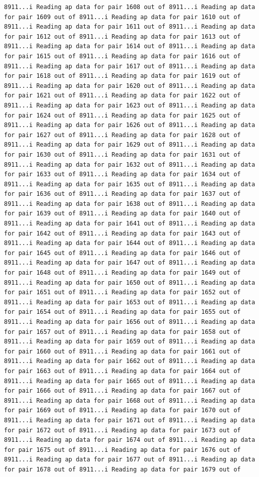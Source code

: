 \documentclass[
]{article}
\begin{document}
\begin{verbatim}
8911...i Reading ap data for pair 1608 out of 8911...i Reading ap data for pair 1609 out of 8911...i Reading ap data for pair 1610 out of 8911...i Reading ap data for pair 1611 out of 8911...i Reading ap data for pair 1612 out of 8911...i Reading ap data for pair 1613 out of 8911...i Reading ap data for pair 1614 out of 8911...i Reading ap data for pair 1615 out of 8911...i Reading ap data for pair 1616 out of 8911...i Reading ap data for pair 1617 out of 8911...i Reading ap data for pair 1618 out of 8911...i Reading ap data for pair 1619 out of 8911...i Reading ap data for pair 1620 out of 8911...i Reading ap data for pair 1621 out of 8911...i Reading ap data for pair 1622 out of 8911...i Reading ap data for pair 1623 out of 8911...i Reading ap data for pair 1624 out of 8911...i Reading ap data for pair 1625 out of 8911...i Reading ap data for pair 1626 out of 8911...i Reading ap data for pair 1627 out of 8911...i Reading ap data for pair 1628 out of 8911...i Reading ap data for pair 1629 out of 8911...i Reading ap data for pair 1630 out of 8911...i Reading ap data for pair 1631 out of 8911...i Reading ap data for pair 1632 out of 8911...i Reading ap data for pair 1633 out of 8911...i Reading ap data for pair 1634 out of 8911...i Reading ap data for pair 1635 out of 8911...i Reading ap data for pair 1636 out of 8911...i Reading ap data for pair 1637 out of 8911...i Reading ap data for pair 1638 out of 8911...i Reading ap data for pair 1639 out of 8911...i Reading ap data for pair 1640 out of 8911...i Reading ap data for pair 1641 out of 8911...i Reading ap data for pair 1642 out of 8911...i Reading ap data for pair 1643 out of 8911...i Reading ap data for pair 1644 out of 8911...i Reading ap data for pair 1645 out of 8911...i Reading ap data for pair 1646 out of 8911...i Reading ap data for pair 1647 out of 8911...i Reading ap data for pair 1648 out of 8911...i Reading ap data for pair 1649 out of 8911...i Reading ap data for pair 1650 out of 8911...i Reading ap data for pair 1651 out of 8911...i Reading ap data for pair 1652 out of 8911...i Reading ap data for pair 1653 out of 8911...i Reading ap data for pair 1654 out of 8911...i Reading ap data for pair 1655 out of 8911...i Reading ap data for pair 1656 out of 8911...i Reading ap data for pair 1657 out of 8911...i Reading ap data for pair 1658 out of 8911...i Reading ap data for pair 1659 out of 8911...i Reading ap data for pair 1660 out of 8911...i Reading ap data for pair 1661 out of 8911...i Reading ap data for pair 1662 out of 8911...i Reading ap data for pair 1663 out of 8911...i Reading ap data for pair 1664 out of 8911...i Reading ap data for pair 1665 out of 8911...i Reading ap data for pair 1666 out of 8911...i Reading ap data for pair 1667 out of 8911...i Reading ap data for pair 1668 out of 8911...i Reading ap data for pair 1669 out of 8911...i Reading ap data for pair 1670 out of 8911...i Reading ap data for pair 1671 out of 8911...i Reading ap data for pair 1672 out of 8911...i Reading ap data for pair 1673 out of 8911...i Reading ap data for pair 1674 out of 8911...i Reading ap data for pair 1675 out of 8911...i Reading ap data for pair 1676 out of 8911...i Reading ap data for pair 1677 out of 8911...i Reading ap data for pair 1678 out of 8911...i Reading ap data for pair 1679 out of 
\end{verbatim}
\end{document}
